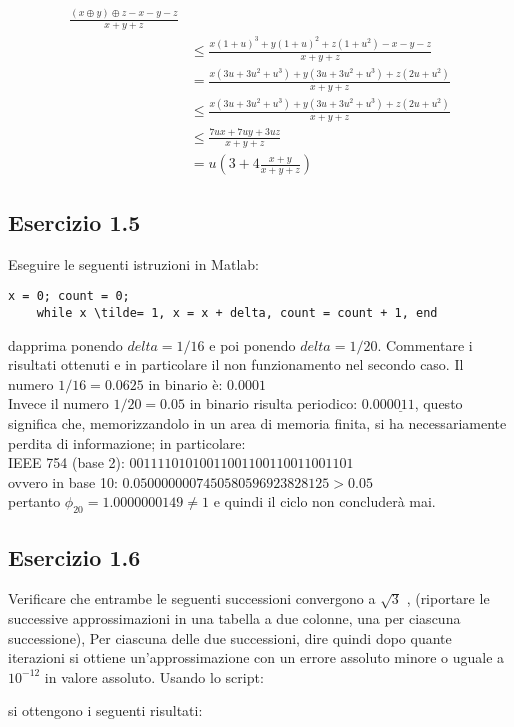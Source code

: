 \begin{equation*}
	\begin{split}
		\frac{(x \oplus y) \oplus z - x - y - z}{x+y+z} \\
			& \leq \frac{x(1+u)^3 + y(1+u)^2 + z(1+u^2) -x -y -z}{x+y+z} \\
	 		& = \frac{x(3u+3u^2+u^3) + y(3u+3u^2+u^3) + z(2u+u^2)}{x+y+z} \\
	 		& \leq \frac{x(3u+3u^2+u^3) + y(3u+3u^2+u^3) + z(2u+u^2)}{x+y+z} \\
	 		& \leq \frac{7ux+7uy+3uz}{x+y+z} \\
	 		& = u(3+4 \frac{x+y}{x+y+z})
	\end{split}
\end{equation*}


	\subsection{Esercizio 1.5}
Eseguire le seguenti istruzioni in Matlab:
\begin{lstlisting}[frame=single]
	x = 0; count = 0;	
	while x \tilde= 1, x = x + delta, count = count + 1, end
\end{lstlisting}
dapprima ponendo $delta = 1/16$ e poi ponendo $delta = 1/20$. Commentare i risultati ottenuti e in particolare il non funzionamento nel secondo caso.
\PP
Il numero $1/16 = 0.0625$ in binario è: $0.0001$\\
Invece il numero $1/20 = 0.05$ in binario risulta periodico: $0.00\underline{0011}$, questo significa che, memorizzandolo in un area di memoria finita, si ha necessariamente perdita di informazione; in particolare:\\
IEEE 754 (base 2): $00111101010011001100110011001101$\\
ovvero in base 10: $0.0500000007450580596923828125 > 0.05$\\
pertanto $\phi_{20} = 1.0000000149 \neq 1$ e quindi il ciclo non concluderà mai.

	\subsection{Esercizio 1.6}
Verificare che entrambe le seguenti successioni convergono a $\sqrt{3}$ , (riportare le successive approssimazioni in una tabella a due colonne, una per ciascuna successione),
Per ciascuna delle due successioni, dire quindi dopo quante iterazioni si ottiene un’approssimazione con un errore assoluto minore o uguale a $10^{-12}$ in valore assoluto.
\PP
Usando lo script:

si ottengono i seguenti risultati:

